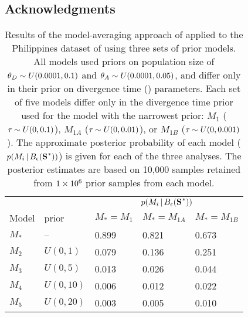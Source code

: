\documentclass[letterpaper,12pt]{article}
\begin{document}
\begin{linenumbers}
\section*{Acknowledgments}

% 


\newpage
\singlespacing

\renewcommand\listfigurename{Figure Captions}
\renewcommand\cftdotsep{\cftnodots}
\setlength\cftbeforefigskip{10pt}
\listoffigures


\end{linenumbers}

\newpage
\singlespacing

\begin{table}[htbp]
    \sffamily
    \footnotesize
    \addtolength{\tabcolsep}{-0.08cm}
    \caption{Results of the model-averaging approach of \citet{Hickerson2013}
        applied to the Philippines dataset of \citet{Oaks2012} using three sets
        of prior models. All models used priors on population size of
        $\meanDescendantTheta{} \sim U(0.0001,0.1)$ and $\ancestralTheta{} \sim
        U(0.0001, 0.05)$, and differ only in their prior on divergence time
        (\divt{}) parameters.  Each set of five models differ only in the
        divergence time prior used for the model with the narrowest prior:
        $M_1$ ($\tau_{} \sim U(0, 0.1)$), $M_{1A}$ ($\tau_{} \sim U(0, 0.01)$),
        or $M_{1B}$ ($\tau_{} \sim U(0, 0.001)$). The approximate posterior
        probability of each model ($p(M_i \given \ssSpace)$) is given for each
        of the three analyses.  The posterior estimates are based on 10,000
        samples retained from $1\times 10^{6}$ prior samples
    from each model.}
    \centering
    \begin{tabular}{ l l l l l }
        \toprule
        & & \multicolumn{3}{c}{$p(M_i \given \ssSpace)$} \\
        \cmidrule(){3-5}
        Model & \divt{} prior & $M_{*}=M_1$ & $M_{*}=M_{1A}$ & $M_{*}=M_{1B}$ \\
        \midrule
        $M_*$ & --        & 0.899 & 0.821 & 0.673 \\
        $M_2$ & $U(0,1)$  & 0.079 & 0.136 & 0.251 \\
        $M_3$ & $U(0,5)$  & 0.013 & 0.026 & 0.044 \\
        $M_4$ & $U(0,10)$ & 0.006 & 0.012 & 0.022 \\
        $M_5$ & $U(0,20)$ & 0.003 & 0.005 & 0.010 \\
        \bottomrule
    \end{tabular}
    \label{tabModelChoiceEmpirical}
\end{table}
\end{document}
